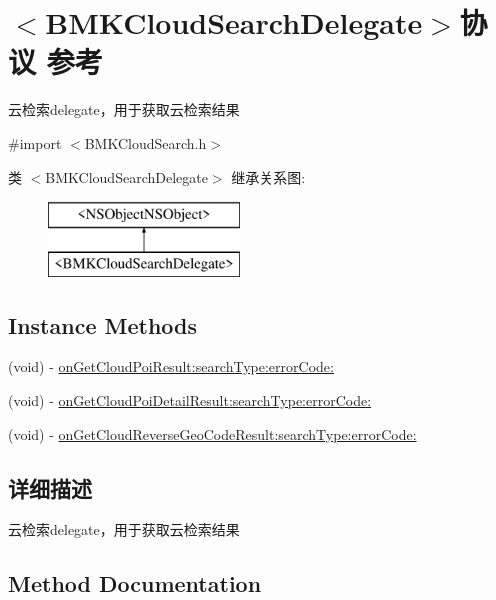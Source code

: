 \hypertarget{protocol_b_m_k_cloud_search_delegate-p}{}\section{$<$B\+M\+K\+Cloud\+Search\+Delegate$>$协议 参考}
\label{protocol_b_m_k_cloud_search_delegate-p}


云检索delegate，用于获取云检索结果  




{\ttfamily \#import $<$B\+M\+K\+Cloud\+Search.\+h$>$}

类 $<$B\+M\+K\+Cloud\+Search\+Delegate$>$ 继承关系图\+:\begin{figure}[H]
\begin{center}
\leavevmode
\includegraphics[height=2.000000cm]{protocol_b_m_k_cloud_search_delegate-p}
\end{center}
\end{figure}
\subsection*{Instance Methods}
\begin{DoxyCompactItemize}
\item 
(void) -\/ \hyperlink{protocol_b_m_k_cloud_search_delegate-p_aadc90dad37954d8527d4aca657c802f4}{on\+Get\+Cloud\+Poi\+Result\+:search\+Type\+:error\+Code\+:}
\item 
(void) -\/ \hyperlink{protocol_b_m_k_cloud_search_delegate-p_a5abcb777d4533baa036beb635268b60d}{on\+Get\+Cloud\+Poi\+Detail\+Result\+:search\+Type\+:error\+Code\+:}
\item 
(void) -\/ \hyperlink{protocol_b_m_k_cloud_search_delegate-p_a2ec5889c5234cffa7e3597f07f681022}{on\+Get\+Cloud\+Reverse\+Geo\+Code\+Result\+:search\+Type\+:error\+Code\+:}
\end{DoxyCompactItemize}


\subsection{详细描述}
云检索delegate，用于获取云检索结果 

\subsection{Method Documentation}
\hypertarget{protocol_b_m_k_cloud_search_delegate-p_a5abcb777d4533baa036beb635268b60d}{}
